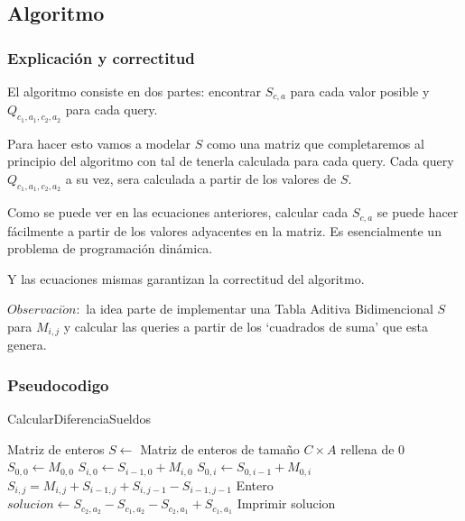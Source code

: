 \subsection{Algoritmo}

\subsubsection*{Explicación y correctitud}

El algoritmo consiste en dos partes: encontrar $S_{c,a}$ para cada valor posible y $Q_{c_1,a_1,c_2,a_2}$
para cada query.

Para hacer esto vamos a modelar $S$ como una matriz que completaremos al principio del 
algoritmo con tal de tenerla calculada para cada query. Cada query $Q_{c_1,a_1,c_2,a_2}$ a su vez, sera calculada
a partir de los valores de $S$.

Como se puede ver en las ecuaciones anteriores, calcular cada $S_{c,a}$ se puede hacer fácilmente a partir de los valores adyacentes
en la matriz. Es esencialmente un problema de programación dinámica.

Y las ecuaciones mismas garantizan la correctitud del algoritmo.

$Observaci\acute{o}n: $ la idea parte de implementar una Tabla Aditiva Bidimencional $S$ para $M_{i,j}$ y calcular las queries a partir
de los `cuadrados de suma' que esta genera.

\subsubsection*{Pseudocodigo}

\begin{algorithm}[H]
    \caption{CalcularDiferenciaSueldos}
    Matriz de enteros $S \gets$ Matriz de enteros de tamaño $C \times A$ rellena de 0 \;
    $S_{0,0} \gets M_{0,0}$ \;
     {
    	$S_{i, 0} \gets S_{i-1, 0} + M_{i, 0}$
    }
     {
    	$S_{0, i} \gets S_{0, i-1} + M_{0, i}$
    }
     {
         {
            $S_{i,j} = M_{i,j} + S_{i-1,j} + S_{i,j-1} - S_{i-1,j-1}$
        }
    }
     {
    	Entero $solucion \gets S_{c_2,a_2} - S_{c_1,a_2} - S_{c_2,a_1} + S_{c_1,a_1}$ \;
        Imprimir solucion
    }
\end{algorithm}

